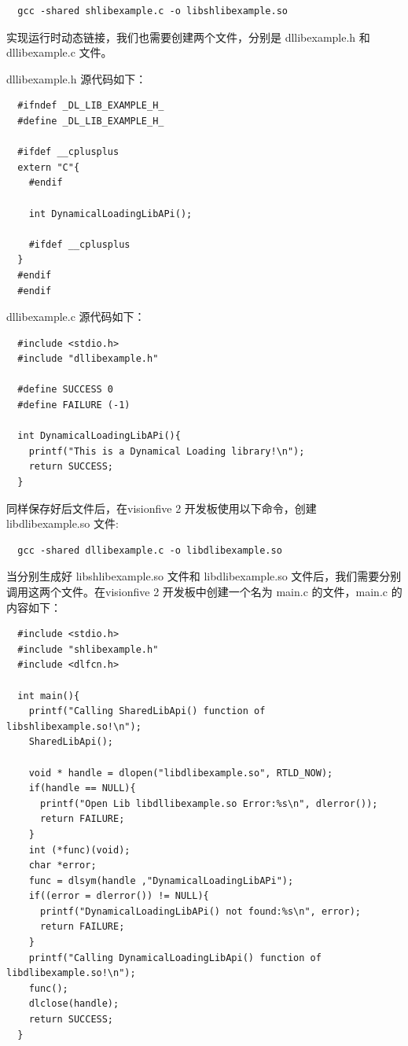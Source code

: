 \documentclass[lang=cn,10pt]{elegantbook}
\begin{document}
\begin{lstlisting}
  gcc -shared shlibexample.c -o libshlibexample.so
\end{lstlisting}
实现运行时动态链接，我们也需要创建两个文件，分别是 dllibexample.h 和 dllibexample.c 文件。

dllibexample.h 源代码如下：

\begin{lstlisting}
  #ifndef _DL_LIB_EXAMPLE_H_
  #define _DL_LIB_EXAMPLE_H_

  #ifdef __cplusplus
  extern "C"{
    #endif
    
    int DynamicalLoadingLibAPi();
    
    #ifdef __cplusplus
  }
  #endif
  #endif
\end{lstlisting}
dllibexample.c 源代码如下：

\begin{lstlisting}
  #include <stdio.h>
  #include "dllibexample.h"

  #define SUCCESS 0
  #define FAILURE (-1)

  int DynamicalLoadingLibAPi(){
    printf("This is a Dynamical Loading library!\n");
    return SUCCESS;
  }
\end{lstlisting}
同样保存好后文件后，在visionfive 2 开发板使用以下命令，创建 libdlibexample.so 文件:

\begin{lstlisting}
  gcc -shared dllibexample.c -o libdlibexample.so
\end{lstlisting}

当分别生成好 libshlibexample.so 文件和 libdlibexample.so 文件后，我们需要分别调用这两个文件。在visionfive 2 开发板中创建一个名为 main.c 的文件，main.c 的内容如下：

\begin{lstlisting}
  #include <stdio.h>
  #include "shlibexample.h"
  #include <dlfcn.h>

  int main(){
    printf("Calling SharedLibApi() function of libshlibexample.so!\n");
    SharedLibApi();
    
    void * handle = dlopen("libdlibexample.so", RTLD_NOW);
    if(handle == NULL){
      printf("Open Lib libdllibexample.so Error:%s\n", dlerror());
      return FAILURE;
    }
    int (*func)(void);
    char *error;
    func = dlsym(handle ,"DynamicalLoadingLibAPi");
    if((error = dlerror()) != NULL){
      printf("DynamicalLoadingLibAPi() not found:%s\n", error);
      return FAILURE;
    }
    printf("Calling DynamicalLoadingLibApi() function of libdlibexample.so!\n");
    func();
    dlclose(handle);
    return SUCCESS;
  }
\end{lstlisting}
\end{document}
